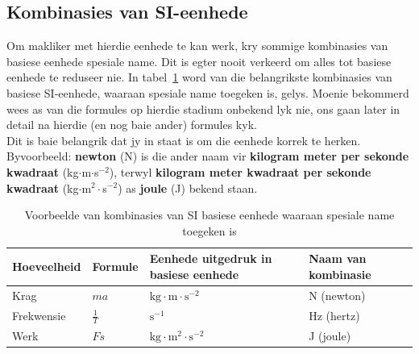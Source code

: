 \subsection*{Kombinasies van SI-eenhede}
            \nopagebreak
Om makliker met hierdie eenhede te kan werk, kry sommige kombinasies van basiese eenhede spesiale name. Dit is egter nooit verkeerd om alles tot basiese eenhede te reduseer nie. In tabel~\ref{tab:SIcombinations} word van die belangrikste kombinasies van basiese SI-eenhede, waaraan spesiale name toegeken is, gelys. Moenie bekommerd wees as van die formules op hierdie stadium onbekend lyk nie, ons gaan later in detail na hierdie (en nog baie ander) formules kyk. \\ 
Dit is baie belangrik dat jy in staat is om die eenhede korrek te herken. Byvoorbeeld: \textbf{newton} (N) is die ander naam vir \textbf{kilogram meter per sekonde kwadraat} (kg$\ensuremath{\cdot}$m$\ensuremath{\cdot}$s${}^{-2}$), terwyl \textbf{kilogram meter kwadraat per sekonde kwadraat} (kg$\ensuremath{\cdot}$m${}^{2}\ensuremath{\cdot}$s${}^{-2}$) as \textbf{joule} (J) bekend staan.
          \begin{table}[H]
        \begin{center}
\noindent
      \begin{tabular}{|l|l|l|l|}\hline
\textbf{Hoeveelheid} & \textbf{Formule} & \textbf{Eenhede uitgedruk in basiese eenhede}& \textbf{Naam van kombinasie} \\ \hline
Krag              & $ma$             & $\text{kg}\cdot \text{m} \cdot \text{s}^{-2}$      & N (newton)                   \\ \hline
Frekwensie         & $\frac{1}{T}$    & $\text{s}^{-1}$                                    & Hz (hertz)                   \\ \hline
Werk              & $Fs$             & $\text{kg} \cdot \text{m}^{2} \cdot \text{s}^{-2}$ & J (joule)                    \\ \hline
    \end{tabular}
\caption{Voorbeelde van kombinasies van SI basiese eenhede waaraan spesiale name toegeken is}
\label{tab:SIcombinations}
      \end{center}
\end{table}
    \par
\label{m30853*notfhsst!!!underscore!!!id306}
